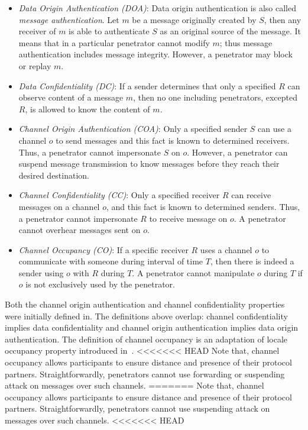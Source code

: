 \begin{itemize}
\item \emph{Data Origin Authentication (DOA)}: Data origin authentication is also called \emph{message authentication}. Let $m$ be a message originally created by $S$, then any receiver of $m$ is able to authenticate $S$ as an original source of the message. It means that in a particular penetrator cannot modify $m$; thus message authentication includes message integrity. However, a penetrator may block or replay $m$. 
\item \emph{Data Confidentiality (DC)}: If a sender determines that only a specified $R$ can observe content of a message $m$, then no one including penetrators, excepted $R$, is allowed to know the content of $m$.
\item \emph{Channel Origin Authentication (COA)}: Only a specified sender $S$ can use a channel $o$ to send messages and this fact is known to determined receivers. Thus, a penetrator cannot impersonate $S$ on $o$. However, a penetrator can suspend message transmission to know messages before they reach their desired destination. 
\item \emph{Channel Confidentiality (CC)}: Only a specified receiver $R$ can receive messages on a channel $o$, and this fact is known to determined senders. Thus, a penetrator cannot impersonate $R$ to receive message on $o$. A penetrator cannot overhear messages sent on $o$.
\item \emph{Channel Occupancy (CO)}: If a specific receiver $R$ uses a channel $o$ to communicate with someone during interval of time $T$, then there is indeed a sender using $o$ with $R$ during $T$. A penetrator cannot manipulate $o$ during $T$ if $o$ is not exclusively used by the penetrator.
\end{itemize} 

Both the channel origin authentication and channel confidentiality properties were initially defined in\cite{Mausch94}. The definitions above overlap: channel confidentiality implies data confidentiality and channel origin authentication implies data origin authentication. The definition of channel occupancy is an adaptation of locale occupancy property introduced in~\cite{Thayer:2010aa}.
<<<<<<< HEAD
Note that, channel occupancy allows participants to ensure distance and presence of their protocol partners. Straightforwardly, penetrators cannot use forwarding or suspending attack on messages over such channels.
=======
Note that, channel occupancy allows participants to ensure distance and presence of their protocol partners. Straightforwardly, penetrators cannot use suspending attack on messages over such channels.
<<<<<<< HEAD

